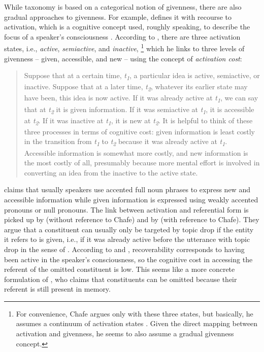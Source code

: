 While  taxonomy is based on a categorical notion of givenness, there are also gradual approaches to givenness.
For example, \citet{chafe1994} defines it with recourse to activation, which is a cognitive concept used, roughly speaking, to describe the focus of a speaker's consciousness \citep[see also][]{chafe1974}.
According to \citet{chafe1994}, there are three activation states, i.e., \textit{active}, \textit{semiactive}, and \textit{inactive},%
\footnote{For convenience, Chafe argues only with these three states, but basically, he assumes a continuum of activation states \citep[55]{chafe1994}.
Given the direct mapping between activation and givenness, he seems to also assume a gradual givenness concept.}
%
which he links to three levels of givenness -- given, accessible, and new -- using the concept of \textit{activation cost}:

\begin{quote}
Suppose that at a certain time, \emph{t\textsubscript{1}}, a particular idea is active, semiactive, or inactive. Suppose that at a later time, \emph{t\textsubscript{2}}, whatever its earlier state may have been, this idea is now active. If it was already active at \emph{t\textsubscript{1}}, we can say that at \emph{t\textsubscript{2}} it is given information. If it was semiactive at \emph{t\textsubscript{1}}, it is accessible at \emph{t\textsubscript{2}}. If it was inactive at \emph{t\textsubscript{1}}, it is new at \emph{t\textsubscript{2}}. It is helpful to think of these three processes in terms of cognitive cost:  given information is least costly in the transition from \emph{t\textsubscript{1}} to \emph{t\textsubscript{2}} because it was already active at \emph{t\textsubscript{1}}. Accessible information is somewhat more costly, and new information is the most costly of all, presumably because more mental effort is involved in converting an idea from the inactive to the active state. \citep[72--73]{chafe1994}
\end{quote}

\noindent
\citet[75]{chafe1994} claims that usually speakers use accented full noun phrases to express new and accessible information while given information is expressed using weakly accented pronouns or null pronouns.
The link between activation and referential form is picked up by \citet{volodina.onea2012} (without reference to Chafe) and by \citet{helmer2016} (with reference to Chafe).
They argue that a constituent can usually only be targeted by topic drop if the entity it refers to is given, i.e., if it was already active before the utterance with topic drop in the sense of \citet{chafe1994}.
According to \citet{volodina.onea2012} and \citet{helmer2016}, recoverability corresponds to having been active in the speaker's consciousness, so the cognitive cost  in accessing the referent of the omitted constituent is low.
This seems like a more concrete formulation of \citet[102]{schwitalla2012}, who claims that constituents can be omitted because their referent is still present in memory.

